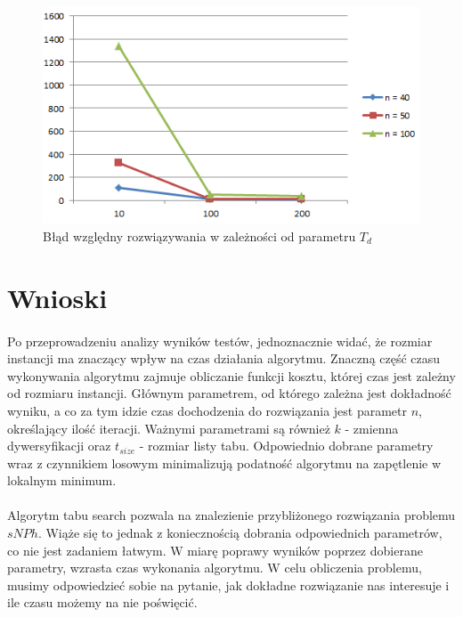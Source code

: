 \documentclass[wide,a4paper,titlepage,12pt] {article}
\begin{document}
\begin{figure}[htbp]
  \begin{center}
         \includegraphics[scale=0.8]{charts/diffAll.PNG}
         \caption{Błąd względny rozwiązywania w zależności od parametru $T_d$}
  \end{center}
\end{figure}

\newpage
\section{Wnioski}
\paragraph{}
Po przeprowadzeniu analizy wyników testów, jednoznacznie widać, że rozmiar instancji ma znaczący wpływ na czas działania algorytmu. Znaczną część czasu wykonywania algorytmu zajmuje obliczanie funkcji kosztu, której czas jest zależny od rozmiaru instancji. Głównym parametrem, od którego zależna jest dokładność wyniku, a co za tym idzie czas dochodzenia do rozwiązania jest parametr $n$, określający ilość iteracji. Ważnymi parametrami są również $k$ - zmienna dywersyfikacji oraz $t_{size}$ - rozmiar listy tabu. Odpowiednio dobrane parametry wraz z czynnikiem losowym minimalizują podatność algorytmu na zapętlenie w lokalnym minimum.

\paragraph{} %
Algorytm tabu search pozwala na znalezienie przybliżonego rozwiązania problemu $sNPh$. Wiąże się to jednak z koniecznością dobrania odpowiednich parametrów, co nie jest zadaniem łatwym. W miarę poprawy wyników poprzez dobierane parametry, wzrasta czas wykonania algorytmu. W celu obliczenia problemu, musimy odpowiedzieć sobie na pytanie, jak dokładne rozwiązanie nas interesuje i ile czasu możemy na nie poświęcić. 
\end{document}
